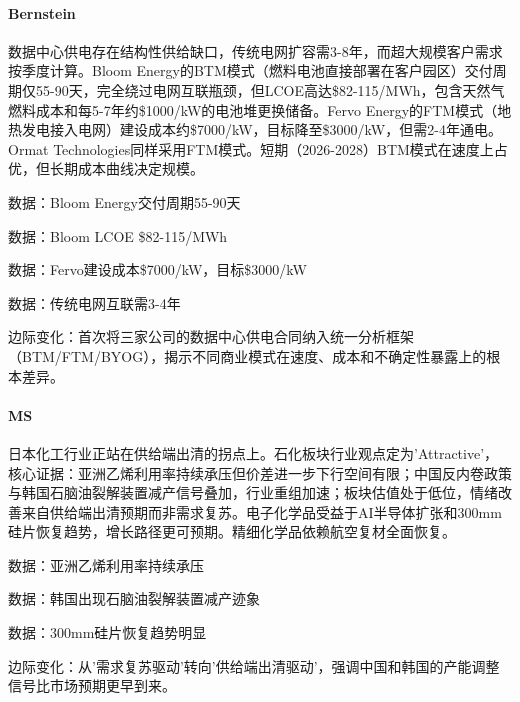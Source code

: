 \documentclass[11pt]{ctexart}
\begin{document}
\paragraph{Bernstein} 数据中心供电存在结构性供给缺口，传统电网扩容需3-8年，而超大规模客户需求按季度计算。Bloom Energy的BTM模式（燃料电池直接部署在客户园区）交付周期仅55-90天，完全绕过电网互联瓶颈，但LCOE高达\$82-115/MWh，包含天然气燃料成本和每5-7年约\$1000/kW的电池堆更换储备。Fervo Energy的FTM模式（地热发电接入电网）建设成本约\$7000/kW，目标降至\$3000/kW，但需2-4年通电。Ormat Technologies同样采用FTM模式。短期（2026-2028）BTM模式在速度上占优，但长期成本曲线决定规模。
{\small\color{refgray}数据：Bloom Energy交付周期55-90天\par}
{\small\color{refgray}数据：Bloom LCOE \$82-115/MWh\par}
{\small\color{refgray}数据：Fervo建设成本\$7000/kW，目标\$3000/kW\par}
{\small\color{refgray}数据：传统电网互联需3-4年\par}
{\small\color{refgray}边际变化：首次将三家公司的数据中心供电合同纳入统一分析框架（BTM/FTM/BYOG），揭示不同商业模式在速度、成本和不确定性暴露上的根本差异。\par}
\paragraph{MS} 日本化工行业正站在供给端出清的拐点上。石化板块行业观点定为'Attractive'，核心证据：亚洲乙烯利用率持续承压但价差进一步下行空间有限；中国反内卷政策与韩国石脑油裂解装置减产信号叠加，行业重组加速；板块估值处于低位，情绪改善来自供给端出清预期而非需求复苏。电子化学品受益于AI半导体扩张和300mm硅片恢复趋势，增长路径更可预期。精细化学品依赖航空复材全面恢复。
{\small\color{refgray}数据：亚洲乙烯利用率持续承压\par}
{\small\color{refgray}数据：韩国出现石脑油裂解装置减产迹象\par}
{\small\color{refgray}数据：300mm硅片恢复趋势明显\par}
{\small\color{refgray}边际变化：从'需求复苏驱动'转向'供给端出清驱动'，强调中国和韩国的产能调整信号比市场预期更早到来。\par}
\end{document}
